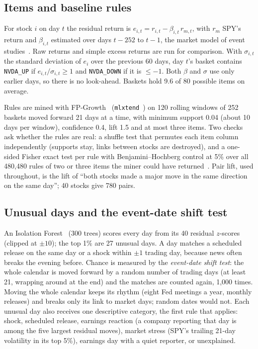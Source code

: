 \documentclass[conference]{IEEEtran}
\begin{document}
\subsection{Items and baseline rules}
For stock $i$ on day $t$ the residual return is $e_{i,t} = r_{i,t} - \beta_{i,t}\, r_{m,t}$, with $r_m$ SPY's return and $\beta_{i,t}$ estimated over days $t-252$ to $t-1$, the market model of event studies~\cite{mackinlay1997}. Raw returns and simple excess returns are run for comparison. With $\sigma_{i,t}$ the standard deviation of $e_i$ over the previous 60 days, day $t$'s basket contains \texttt{NVDA\_UP} if $e_{i,t}/\sigma_{i,t} \geq 1$ and \texttt{NVDA\_DOWN} if it is $\leq -1$. Both $\beta$ and $\sigma$ use only earlier days, so there is no look-ahead. Baskets hold 9.6 of 80 possible items on average.

Rules are mined with FP-Growth~\cite{han2000} (\texttt{mlxtend}~\cite{raschka2018}) on 120 rolling windows of 252 baskets moved forward 21 days at a time, with minimum support 0.04 (about 10 days per window), confidence 0.4, lift 1.5 and at most three items. Two checks ask whether the rules are real: a shuffle test that permutes each item column independently (supports stay, links between stocks are destroyed), and a one-sided Fisher exact test per rule with Benjamini--Hochberg control at 5\% over all 480,480 rules of two or three items the miner could have returned~\cite{webb2007}. Pair lift, used throughout, is the lift of ``both stocks made a major move in the same direction on the same day''; 40 stocks give 780 pairs.

\subsection{Unusual days and the event-date shift test}
An Isolation Forest~\cite{liu2008} (300 trees) scores every day from its 40 residual $z$-scores (clipped at $\pm10$); the top 1\% are 27 unusual days. A day matches a scheduled release on the same day or a shock within $\pm1$ trading day, because news often breaks the evening before. Chance is measured by the \emph{event-date shift test}: the whole calendar is moved forward by a random number of trading days (at least 21, wrapping around at the end) and the matches are counted again, 1,000 times. Moving the whole calendar keeps its rhythm (eight Fed meetings a year, monthly releases) and breaks only its link to market days; random dates would not. Each unusual day also receives one descriptive category, the first rule that applies: shock, scheduled release, earnings reaction (a company reporting that day is among the five largest residual moves), market stress (SPY's trailing 21-day volatility in its top 5\%), earnings day with a quiet reporter, or unexplained.
\end{document}
